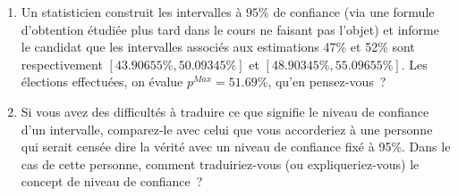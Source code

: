 \documentclass[10pt]{report}
\begin{document}
\begin{exercice}
\begin{enumerate}
\item Un statisticien construit les intervalles à $95\%$ de confiance (via une formule d'obtention étudiée plus tard dans le cours ne faisant pas l'objet) et informe le candidat que les intervalles associés aux estimations 47\% et 52\% sont respectivement $[43.90655\%,50.09345\%]$ et $[48.90345\%,55.09655\%]$. Les élections effectuées, on évalue $p^{Max}=51.69\%$, qu'en pensez-vous~?


\item Si vous avez des difficultés à traduire ce que signifie le niveau de confiance d'un intervalle, comparez-le avec celui que vous accorderiez à une personne qui serait censée dire la vérité avec un niveau de confiance fixé à 95\%. Dans le cas de cette personne, comment traduiriez-vous (ou expliqueriez-vous) le concept de niveau de confiance~? \\

\end{enumerate}

\end{exercice}
\end{document}
